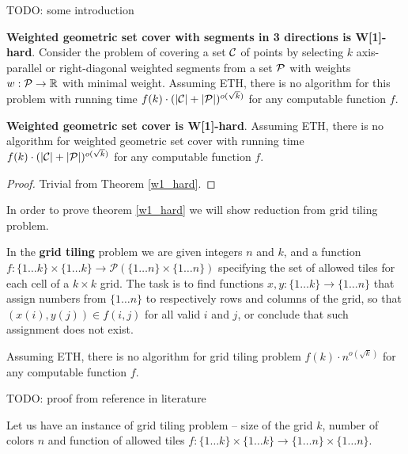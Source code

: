 TODO: some introduction

\begin{tw}
\label{w1_hard}
	\textbf{Weighted geometric set cover with segments in 3 directions is W[1]-hard}.
	Consider the problem of covering a set $\mathcal{C}$ of points
	by selecting $k$ axis-parallel or right-diagonal weighted segments
	from a set $\mathcal{P}$ 
	with weights $w : \mathcal{P} \rightarrow \mathbb{R}$
	with minimal weight.
	Assuming ETH, there is no algorithm for this
	problem with running time
	$f(k)\cdot(|\mathcal{C}| + |\mathcal{P}|)^{o(\sqrt{k})}$
	for any computable function $f$.
\end{tw}

\begin{corollary}
	\textbf{Weighted geometric set cover is W[1]-hard}.
	Assuming ETH, there is no algorithm for weighted geometric set cover
	with running time
	$f(k)\cdot(|\mathcal{C}| + |\mathcal{P}|)^{o(\sqrt{k})}$
	for any computable function $f$.
\end{corollary}

\begin{proof}
Trivial from Theorem \ref{w1_hard}. 
\end{proof}

In order to prove theorem \ref{w1_hard} we will show reduction from grid tiling problem.

\begin{defi}
In the \textbf{grid tiling} problem we are given integers $n$ and $k$,
and a function
$f : \{1 \ldots k\} \times \{1 \ldots k\} \rightarrow \mathcal{P}(\{1 \ldots n\} \times \{1 \ldots n\})$
specifying the set of allowed tiles for each cell of a $k \times k$ grid.
The task is to find functions
$x,y : \{1 \ldots k\} \rightarrow \{1 \ldots n\}$
that assign numbers from $\{1 \ldots n\}$
to respectively rows and columns of the grid,
so that $(x(i), y(j)) \in f(i, j)$ for all valid $i$ and $j$,
or conclude that such assignment does not exist.
\end{defi}


\begin{tw}
\label{grid_tiling_w1_hard}
Assuming ETH, there is no algorithm for grid tiling problem
$f(k)\cdot n^{o(\sqrt{k})}$
for any computable function $f$.
\end{tw}

TODO: proof from reference in literature

Let us have an instance of grid tiling problem -- size of the
grid $k$, number of colors $n$
and function of allowed tiles
$f : \{1 \ldots k\} \times \{1 \ldots k\} \rightarrow \{1 \ldots n\} \times \{1 \ldots n\}$.

